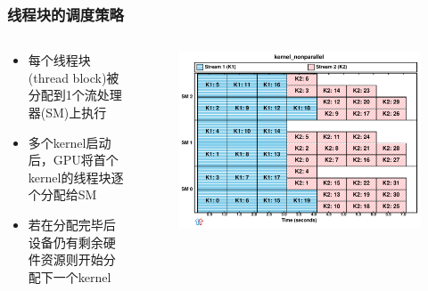 \documentclass[aspectratio=169]{ctexbeamer}
\begin{document}
\begin{frame}
  \frametitle{线程块的调度策略}
  \begin{columns}
    \begin{column}{0.4\textwidth}
      \begin{itemize}
        \item 每个线程块(thread block)被分配到1个流处理器(SM)上执行
        \item 多个kernel启动后，GPU将首个kernel的线程块逐个分配给SM
        \item 若在分配完毕后设备仍有剩余硬件资源则开始分配下一个kernel
      \end{itemize}
    \end{column}
    \begin{column}{0.60\textwidth}
      \begin{figure}
        \includegraphics[width=\textwidth]{figures/kernel_nonparallel.pdf}
      \end{figure}
    \end{column}
  \end{columns}
\end{frame}
\end{document}
